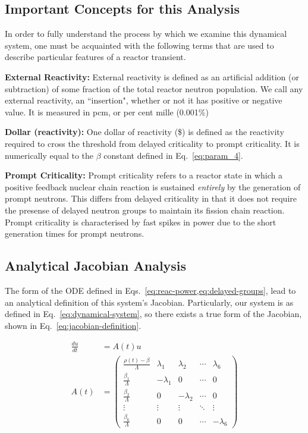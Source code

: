 \documentclass[review,onefignum,onetabnum]{siamart171218}
\begin{document}
\subsection{Important Concepts for this Analysis}
In order to fully understand the process by which we examine this dynamical system,
one must be acquainted with the following terms that are used to describe particular
features of a reactor transient.
\begin{definition}{\textbf{External Reactivity:}}
  External reactivity is defined as an artificial addition (or subtraction) of
  some fraction of the total reactor neutron population. We call any external reactivity,
  an ``insertion", whether or not it has positive or negative value. It is measured in pcm,
  or per cent mille (0.001\%)
\end{definition}
\begin{definition}{\textbf{Dollar (reactivity):}}
  One dollar of reactivity (\$) is defined as the reactivity required to cross the
  threshold from delayed criticality to prompt criticality. It is numerically equal
  to the $\beta$ constant defined in Eq.~\cref{eq:param_4}.
\end{definition}
\begin{definition}{\textbf{Prompt Criticality:}}
  Prompt criticality refers to a reactor state in which a positive feedback nuclear
  chain reaction is sustained \emph{entirely} by the generation of prompt neutrons.
  This differs from delayed criticality in that it does not require the presense of
  delayed neutron groups to maintain its fission chain reaction. Prompt criticality
  is characterised by fast spikes in power due to the short generation times for
  prompt neutrons.
\end{definition}


\subsection{Analytical Jacobian Analysis}
The form of the ODE defined in Eqs.~\cref{eq:reac-power,eq:delayed-groups},
lead to an analytical definition of this system's Jacobian.\cite{Ganopol_accurate}
Particularly, our system is as defined in Eq.~\cref{eq:dynamical-system}, so
there exists a true form of the Jacobian, shown in Eq.~\cref{eq:jacobian-definition}.

\begin{align}
  \label{eq:dynamical-system}
  \frac{du}{dt} &= A(t)u\\
  \label{eq:jacobian-definition}
  A(t) &= \begin{pmatrix}\frac{\rho(t)-\beta}{\Lambda}&\lambda_1&\lambda_2&\cdots&\lambda_6\\
                      \frac{\beta_1}{\Lambda}&-\lambda_1&0&\cdots&0\\
                      \frac{\beta_2}{\Lambda}&0&-\lambda_2&\cdots&0\\
                      \vdots&\vdots&\vdots&\ddots&\vdots\\
                      \frac{\beta_6}{\Lambda}&0&0&\cdots&-\lambda_6\end{pmatrix}
\end{align}
\end{document}
